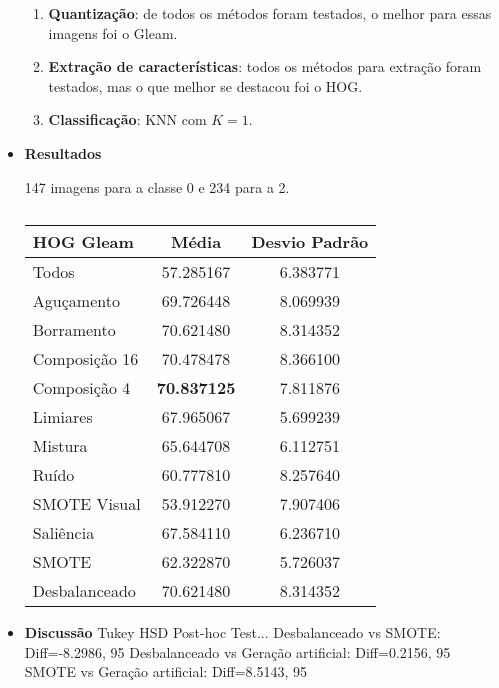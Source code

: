 \begin{itemize}
\begin{enumerate}
\item \textbf{Quantização}: de todos os métodos foram testados, o melhor para essas imagens foi o Gleam.
\item \textbf{Extração de características}: todos os métodos para extração foram testados, mas o que melhor se destacou foi o HOG.
\item \textbf{Classificação}: KNN com $K=1$.
\end{enumerate}

\item[] \textbf{Resultados}

147 imagens para a classe 0 e 234 para a 2.

\begin{minipage}{\linewidth}
\begin{table}[H]
\begin{center}
\caption{}
\label{tab:resultados:4.2}
\begin{tabular}{|l|c|c|}
\hline
\textbf{HOG Gleam} & \textbf{Média}     & \textbf{Desvio Padrão} \\ \hline
   Todos        &  57.285167 &  6.383771  \\ \hline
  Aguçamento    &  69.726448 &  8.069939  \\ \hline
  Borramento    &  70.621480 &  8.314352  \\ \hline
  Composição 16 &  70.478478 &  8.366100  \\ \hline
  Composição 4  &  \textbf{70.837125} &  7.811876  \\ \hline
  Limiares      &  67.965067 &  5.699239  \\ \hline
  Mistura       &  65.644708 &  6.112751  \\ \hline
  Ruído         &  60.777810 &  8.257640  \\ \hline
  SMOTE Visual  &  53.912270 &  7.907406  \\ \hline
  Saliência     &  67.584110 &  6.236710  \\ \hline
 SMOTE          &  62.322870 &  5.726037  \\ \hline
Desbalanceado   &  70.621480 &  8.314352  \\ \hline
\end{tabular}
\end{center}
\end{table}
\end{minipage}

\item[] \textbf{Discussão}
Tukey HSD Post-hoc Test...
Desbalanceado vs SMOTE: Diff=-8.2986, 95%
Desbalanceado vs Geração artificial: Diff=0.2156, 95%
SMOTE vs Geração artificial: Diff=8.5143, 95%

\end{itemize}


